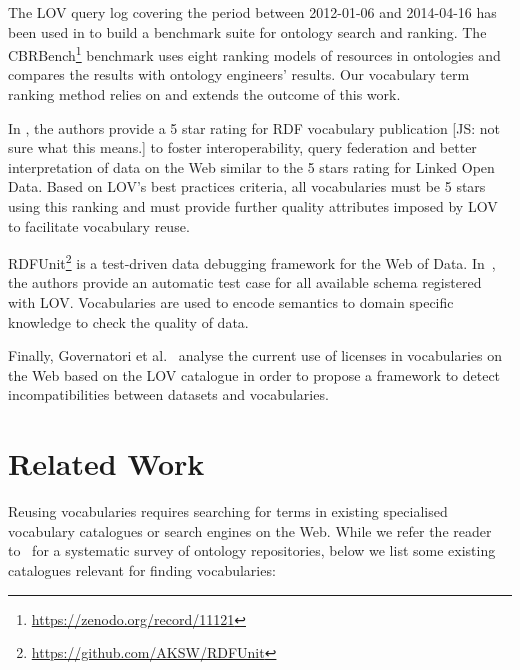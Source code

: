 \documentclass{iosart2c}
\begin{document}
The LOV query log covering the period between 2012-01-06 and 2014-04-16 has been used in \cite{butt2014} to build a benchmark suite for ontology search and ranking. The CBRBench\footnote{\url{https://zenodo.org/record/11121}} benchmark uses eight ranking models of resources in ontologies and compares the results  with ontology engineers' results. Our vocabulary term ranking method relies on and extends the outcome of this work.


In \cite{janowicz2014five}, the authors provide a 5 star rating for RDF vocabulary publication [JS: not sure what this means.] to foster interoperability, query federation and better interpretation of data on the Web similar to the 5 stars rating for Linked Open Data. Based on LOV's  best practices criteria, all vocabularies must be 5 stars using this ranking and must provide further quality attributes imposed by LOV to facilitate vocabulary reuse.


RDFUnit\footnote{\url{https://github.com/AKSW/RDFUnit}} is a test-driven data debugging framework for the Web of Data. In~\cite{rdfunit}, the authors provide an automatic test case for all available schema registered with LOV. Vocabularies are used to encode semantics to domain specific knowledge to check the quality of data.

Finally, Governatori et al.~\cite{governatori2014} analyse the current use of licenses in vocabularies on the Web based on the LOV catalogue in order to propose a framework to detect incompatibilities between datasets and vocabularies.



\section{Related Work}
\label{sec:related}
Reusing vocabularies requires searching for terms in existing specialised vocabulary catalogues or search engines on the Web. While we refer the reader to~\cite{AquinJoWS12} for a systematic survey of ontology repositories, below we list some existing catalogues relevant for finding vocabularies:  
\end{document}
